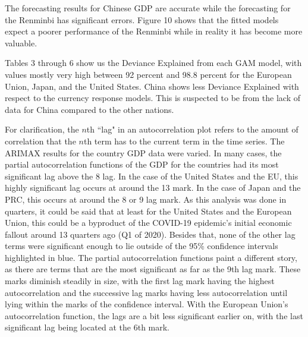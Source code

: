 \documentclass[11pt,regno]{amsart}
\theoremstyle{plain}
\numberwithin{equation}{section}
\begin{document}
The forecasting results for Chinese GDP are accurate while the forecasting for the Renminbi has significant errors. Figure 10 shows that the fitted models expect a poorer performance of the Renminbi while in reality it has become more valuable.

Tables 3 through 6 show us the Deviance Explained from each GAM model, with values mostly very high between 92 percent and 98.8 percent for the European Union, Japan, and the United States. China shows less Deviance Explained with respect to the currency response models. This is suspected to be from the lack of data for China compared to the other nations.

For clarification, the $n$th “lag" in an autocorrelation plot refers to the amount of correlation that the $n$th term has to the current term in the time series. The ARIMAX results for the country GDP data were varied. In many cases, the partial autocorrelation functions of the GDP for the countries had its most significant lag above the 8 lag. In the case of the United States and the EU, this highly significant lag occurs at around the 13 mark. In the case of Japan and the PRC, this occurs at around the 8 or 9 lag mark. As this analysis was done in quarters, it could be said that at least for the United States and the European Union, this could be a byproduct of the COVID-19 epidemic's initial economic fallout around 13 quarters ago (Q1 of 2020). Besides that, none of the other lag terms were significant enough to lie outside of the 95\% confidence intervals highlighted in blue. The partial autocorrelation functions paint a different story, as there are terms that are the most significant as far as the 9th lag mark. These marks diminish steadily in size, with the first lag mark having the highest autocorrelation and the successive lag marks having less autocorrelation until lying within the marks of the confidence interval. With the European Union's autocorrelation function, the lags are a bit less significant earlier on, with the last significant lag being located at the 6th mark. 
\end{document}
